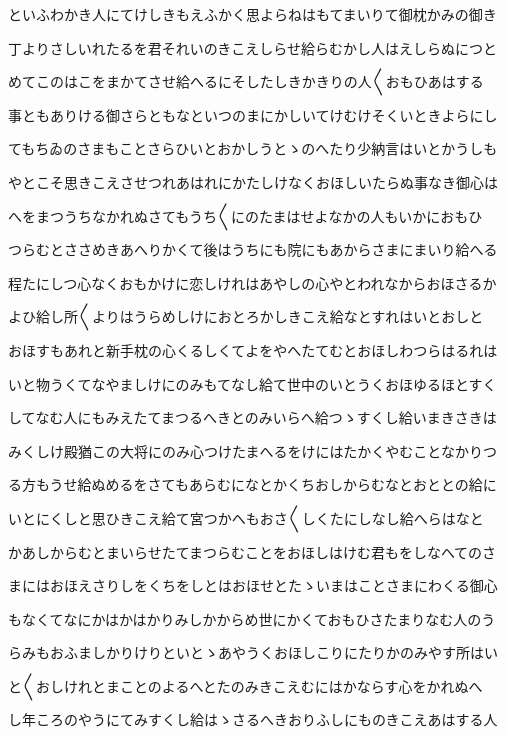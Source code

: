 \documentclass[a4paper,11pt,landscape]{ltjtarticle}
\begin{document}
といふわかき人にてけしきもえふかく思よらねはもてまいりて御枕かみの御き
\par\medskip
丁よりさしいれたるを君それいのきこえしらせ給らむかし人はえしらぬにつと
\par\medskip
めてこのはこをまかてさせ給へるにそしたしきかきりの人〱おもひあはする
\par\medskip
事ともありける御さらともなといつのまにかしいてけむけそくいときよらにし
\par\medskip
てもちゐのさまもことさらひいとおかしうとゝのへたり少納言はいとかうしも
\par\medskip
やとこそ思きこえさせつれあはれにかたしけなくおほしいたらぬ事なき御心は
\par\medskip
へをまつうちなかれぬさてもうち〱にのたまはせよなかの人もいかにおもひ
\par\medskip
つらむとささめきあへりかくて後はうちにも院にもあからさまにまいり給へる
\par\medskip
程たにしつ心なくおもかけに恋しけれはあやしの心やとわれなからおほさるか
\par\medskip
よひ給し所〱よりはうらめしけにおとろかしきこえ給なとすれはいとおしと
\par\medskip
おほすもあれと新手枕の心くるしくてよをやへたてむとおほしわつらはるれは
\par\medskip
いと物うくてなやましけにのみもてなし給て世中のいとうくおほゆるほとすく
\par\medskip
してなむ人にもみえたてまつるへきとのみいらへ給つゝすくし給いまきさきは
\par\medskip
みくしけ殿猶この大将にのみ心つけたまへるをけにはたかくやむことなかりつ
\par\medskip
る方もうせ給ぬめるをさてもあらむになとかくちおしからむなとおととの給に
\par\medskip
いとにくしと思ひきこえ給て宮つかへもおさ〱しくたにしなし給へらはなと
\par\medskip
かあしからむとまいらせたてまつらむことをおほしはけむ君もをしなへてのさ
\par\medskip
まにはおほえさりしをくちをしとはおほせとたゝいまはことさまにわくる御心
\par\medskip
もなくてなにかはかはかりみしかからめ世にかくておもひさたまりなむ人のう
\par\medskip
らみもおふましかりけりといとゝあやうくおほしこりにたりかのみやす所はい
\par\medskip
と〱おしけれとまことのよるへとたのみきこえむにはかならす心をかれぬへ
\par\medskip
し年ころのやうにてみすくし給はゝさるへきおりふしにものきこえあはする人
\end{document}
